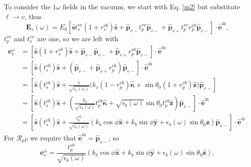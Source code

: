To consider the $1\omega$ fields in the vacuum, we start with Eq. \eqref{m2}
but substitute $\ell\rightarrow v$, thus
\begin{equation*}
\mathbf{E}_{v}(\omega)= E_{0}
\left[
  \hat{\mathbf{s}} t^{vv}_s(1+r^{v b}_s)\hat{\mathbf{s}}
+ \hat{\mathbf{p}}_{v-}t^{vv}_{p}\hat{\mathbf{p}}_{v-}
+ \hat{\mathbf{p}}_{v+}t^{vv}_{p}r^{v b}_{p}\hat{\mathbf{p}}_{v-}
\right]
\cdot\hat{\mathbf{e}}^{\mathrm{in}}
,
\end{equation*}
$t_{p}^{vv}$ and $t_{s}^{vv}$ are one, so we are left with
\begin{equation*}
\begin{split}
\mathbf{e}^{\omega}_{v}
&= \left[
  \hat{\mathbf{s}}(1+r^{v b}_s)\hat{\mathbf{s}}
+ \hat{\mathbf{p}}_{v-}\hat{\mathbf{p}}_{v-}
+ \hat{\mathbf{p}}_{v+}r^{v b}_{p}\hat{\mathbf{p}}_{v-}
\right]
\cdot\hat{\mathbf{e}}^{\mathrm{in}}\\
&= \left[
  \hat{\mathbf{s}}(t^{vb}_s)\hat{\mathbf{s}}
+ (\hat{\mathbf{p}}_{v-} + \hat{\mathbf{p}}_{v+}r^{v b}_{p})
  \hat{\mathbf{p}}_{v-}
\right]
\cdot\hat{\mathbf{e}}^{\mathrm{in}}\\
&= \left[
  \hat{\mathbf{s}}(t^{vb}_s)\hat{\mathbf{s}}
+ \frac{1}{\sqrt{\epsilon_{v}(\omega)}}
\big(
  k_{v}(1 - r^{vb}_{p})\hat{\boldsymbol{\kappa}}
+ \sin\theta_{0}(1 + r^{vb}_{p})
\hat{\mathbf{z}}
\big)
  \hat{\mathbf{p}}_{v-}
\right]\\
&= \left[
  \hat{\mathbf{s}}(t^{vb}_s)\hat{\mathbf{s}}
+ \left(
  \frac{k_{b}}{\sqrt{\epsilon_{b}(\omega)}}
  t^{v b}_{p}\hat{\boldsymbol{\kappa}} 
+ \sqrt{\epsilon_{b}(\omega)}\sin\theta_{0}
  t^{v b}_{p}\hat{\mathbf{z}}
  \right)
  \hat{\mathbf{p}}_{v-}
\right]
\cdot\hat{\mathbf{e}}^{\mathrm{in}}\\
&= \left[
  \hat{\mathbf{s}}(t^{vb}_s)\hat{\mathbf{s}}
+ \frac{t^{v b}_{p}}{\sqrt{\epsilon_{b}(\omega)}}\left(
  k_{b}\cos\phi\hat{\mathbf{x}}
+ k_{b}\sin\phi\hat{\mathbf{y}}
+ \epsilon_{b}(\omega)\sin\theta_{0}\hat{\mathbf{z}}
  \right)
  \hat{\mathbf{p}}_{v-}
\right]
\cdot\hat{\mathbf{e}}^{\mathrm{in}}.
\end{split}
\end{equation*}
For $\mathcal{R}_{pP}$ we require that $\hat{\mathbf{e}}^{\mathrm{in}} =
\hat{\mathbf{p}}_{v-}$, so
\begin{equation*}
\mathbf{e}^{\omega}_{v} =
\frac{t^{v b}_{p}}{\sqrt{\epsilon_{b}(\omega)}}
\left(
  k_{b}\cos\phi\hat{\mathbf{x}}
+ k_{b}\sin\phi\hat{\mathbf{y}}
+ \epsilon_{b}(\omega)\sin\theta_{0}\hat{\mathbf{z}}
  \right),
\end{equation*}
